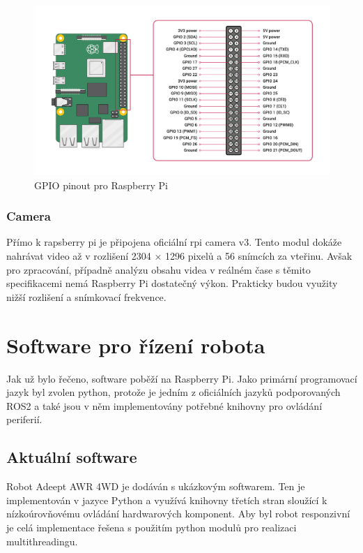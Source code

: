 \begin{figure}[h!]
	\centering
	\includegraphics[scale=0.15]{obrazky-figures/gpio_pinout.png}
	\caption{GPIO pinout pro Raspberry Pi}
	\label{}
\end{figure}

\subsection*{Camera}
Přímo k rapsberry pi je připojena oficiální rpi camera v3. Tento modul dokáže nahrávat video až v rozlišení 2304 × 1296 pixelů a 56 snímcích za vteřinu. Avšak pro zpracování, případně analýzu obsahu videa v reálném čase s těmito specifikacemi nemá Raspberry Pi dostatečný výkon. Prakticky budou využity nižší rozlišení a snímkovací frekvence. \cite{rpi_camera}

\chapter{Software pro řízení robota}
Jak už bylo řečeno, software poběží na Raspberry Pi. Jako primární programovací jazyk byl zvolen python, protože je jedním z oficiálních jazyků podporovaných ROS2 a také jsou v něm implementovány potřebné knihovny pro ovládání periferií.

\section{Aktuální software}
Robot Adeept AWR 4WD je dodáván s ukázkovým softwarem. Ten je implementován v jazyce Python a využívá knihovny třetích stran sloužící k nízkoúrovňovému ovládání hardwarových komponent. Aby byl robot responzivní je celá implementace řešena s použitím python modulů pro realizaci multithreadingu.

